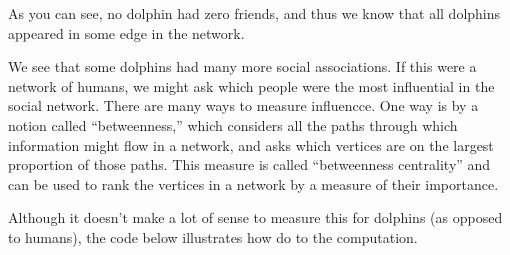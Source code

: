 \documentclass[letterpaper,10pt,english]{sphinxmanual}
\begin{document}
\begin{sphinxVerbatim}[commandchars=\\\{\}]
[0, 9, 6, 6, 5, 8, 8, 7, 4, 4, 2, 2, 1]
\end{sphinxVerbatim}

\begin{sphinxVerbatim}[commandchars=\\\{\}]
   
    
   
  
  
  
\end{sphinxVerbatim}

\noindent{}

As you can see, no dolphin had zero friends, and thus we know that all dolphins appeared in some edge in the network.

We see that some dolphins had many more social associations.  If this were a network of humans, we might ask which people were the most influential in the social network.  There are many ways to measure influencce.  One way is by a notion called “betweenness,” which considers all the paths through which information might flow in a network, and asks which vertices are on the largest proportion of those paths.  This measure is called “betweenness centrality” and can be used to rank the vertices in a network by a measure of their importance.

Although it doesn’t make a lot of sense to measure this for dolphins (as opposed to humans), the code below illustrates how do to the computation.

\begin{sphinxVerbatim}[commandchars=\\\{\}]
      
                            
      
\end{sphinxVerbatim}
\end{document}
